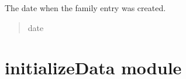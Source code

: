 \documentclass[letterpaper,10pt,english]{sphinxmanual}
\begin{document}
\begin{fulllineitems}
\begin{fulllineitems}
\label{\detokenize{app.mysql:app.mysql.family.Family.createDate}}
\pysigstartsignatures
\pysigline
{}
\pysigstopsignatures
\sphinxAtStartPar
The date when the family entry was created.
\begin{quote}\begin{description}
\sphinxAtStartPar
date

\end{description}\end{quote}

\end{fulllineitems}


\end{fulllineitems}



\section{initializeData module}
\label{\detokenize{app.mysql:module-app.mysql.initializeData}}\label{\detokenize{app.mysql:initializedata-module}}
\end{document}
